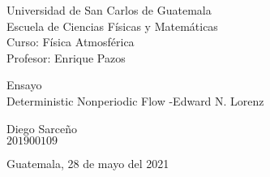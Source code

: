 \begin{flushleft}
    Universidad de San Carlos de Guatemala \\
    Escuela de Ciencias Físicas y Matemáticas \\
    Curso: Física Atmosférica \\
    Profesor: Enrique Pazos
\end{flushleft}

\vspace{6cm}

\begin{center}
    \huge{Ensayo} \\[1cm]
    \LARGE{Deterministic Nonperiodic Flow -Edward N. Lorenz}
\end{center}

\vspace{8cm}

\begin{flushright}
    Diego Sarceño \\
    $201900109$
\end{flushright}

\vspace{0.5cm}

\begin{center}
    Guatemala, 28 de mayo del 2021
\end{center}